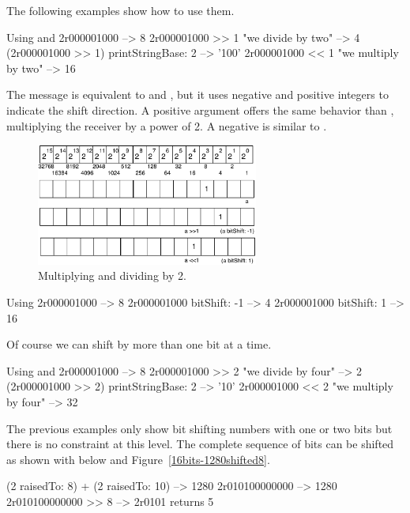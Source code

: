 \documentclass[a4paper,10pt,twoside]{book}
\begin{document}
The following examples show how to use them.

\begin{code}{Using \ct{>>} and \ct{<<}}
2r000001000 
	--> 8
2r000001000 >> 1					"we divide by two"
	--> 4
(2r000001000 >> 1) printStringBase: 2 	
	--> '100'
2r000001000 << 1					"we multiply by two"
	--> 16
\end{code}

The message  is equivalent to \ct{>>} and \ct{<<}, but it uses negative and positive integers to indicate the shift direction. A positive argument offers the same behavior than \ct{<<}, multiplying the receiver by a power of 2. A negative is similar to \ct{>>}. 

\begin{figure}[h]
\begin{center}
\includegraphics[width=0.65\textwidth]{16bits-numberMultiplication}
\caption{Multiplying and dividing by 2.\label{bitshiftmult}}
\end{center}
\end{figure}

\begin{code}{Using }
2r000001000 
	--> 8
2r000001000 bitShift: -1
	--> 4
2r000001000 bitShift: 1
	--> 16
\end{code}

Of course we can shift by more than one bit at a time. 

\begin{code}{Using \ct{>>} and \ct{<<}}
2r000001000 
	--> 8
2r000001000 >> 2					"we divide by four"
	--> 2
(2r000001000 >> 2) printStringBase: 2 
	--> '10'	
2r000001000 << 2					"we multiply by four"
	--> 32
\end{code}


The previous examples only show bit shifting numbers with one or two bits but there is no constraint at this level.
The complete sequence of bits can be shifted as shown with  below and Figure~\ref{16bits-1280shifted8}.

\begin{code}{}
(2 raisedTo: 8) + (2 raisedTo: 10) 
	--> 1280
2r010100000000
	--> 1280
2r010100000000 >> 8
	-->	2r0101
	returns 5
\end{code}
\end{document}
